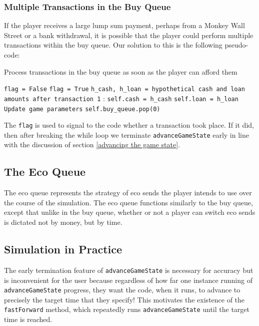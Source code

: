 \documentclass[12pt,letterpaper]{article}
\theoremstyle{remark}
\theoremstyle{plain}
\begin{document}
\subsubsection{Multiple Transactions in the Buy Queue}

If the player receives a large lump sum payment, perhaps from a Monkey Wall Street or a bank withdrawal, it is possible that the player could perform multiple transactions within the buy queue. Our solution to this is the following pseudo-code:

\begin{algorithm}
\caption{Process transactions in the buy queue as soon as the player can afford them}
\begin{algorithmic}
\State\texttt{flag = False}
	\State\texttt{flag = True}
    \State \texttt{h\_cash, h\_loan = hypothetical cash and loan amounts after transaction 1}
    :
    	\State\texttt{self.cash = h\_cash}
    	\State\texttt{self.loan = h\_loan}
    	\State\texttt{Update game parameters}
    	\State \texttt{self.buy\_queue.pop(0)}
   	\Else
   	\EndIf
\EndWhile
\end{algorithmic}
\end{algorithm}

The \texttt{flag} is used to signal to the code whether a transaction took place. If it did, then after breaking the while loop we terminate \texttt{advanceGameState} early in line with the discussion of section \ref{advancing the game state}.

\subsection{The Eco Queue}

The eco queue represents the strategy of eco sends the player intends to use over the course of the simulation. The eco queue functions similarly to the buy queue, except that unlike in the buy queue, whether or not a player can switch eco sends is dictated not by money, but by time.

\subsection{Simulation in Practice}

The early termination feature of \texttt{advanceGameState} is necessary for accuracy but is inconvenient for the user because regardless of how far one instance running of \texttt{advanceGameState} progress, they want the code, when it runs, to advance to precisely the target time that they specify!  This motivates the existence of the \texttt{fastForward} method, which repeatedly runs \texttt{advanceGameState} until the target time is reached.
\end{document}
